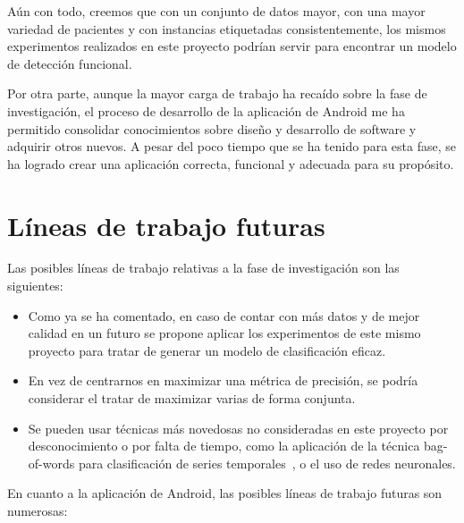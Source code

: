 Aún con todo, creemos que con un conjunto de datos mayor, con una mayor variedad de pacientes y con instancias etiquetadas consistentemente, los mismos experimentos realizados en este proyecto podrían servir para encontrar un modelo de detección funcional. 

Por otra parte, aunque la mayor carga de trabajo ha recaído sobre la fase de investigación, el proceso de desarrollo de la aplicación de Android me ha permitido consolidar conocimientos sobre diseño y desarrollo de software y adquirir otros nuevos. A pesar del poco tiempo que se ha tenido para esta fase, se ha logrado crear una aplicación correcta, funcional y adecuada para su propósito. 

\section{Líneas de trabajo futuras}

Las posibles líneas de trabajo relativas a la fase de investigación son las siguientes: 

\begin{itemize}
	\item Como ya se ha comentado, en caso de contar con más datos y de mejor calidad en un futuro se propone aplicar los experimentos de este mismo proyecto para tratar de generar un modelo de clasificación eficaz. 
	\item En vez de centrarnos en maximizar una métrica de precisión, se podría considerar el tratar de maximizar varias de forma conjunta. 
	\item Se pueden usar técnicas más novedosas no consideradas en este proyecto por desconocimiento o por falta de tiempo, como la aplicación de la técnica bag-of-words para clasificación de series temporales~\cite{bagofwords}, o el uso de redes neuronales. 
\end{itemize}

En cuanto a la aplicación de Android, las posibles líneas de trabajo futuras son numerosas: 


